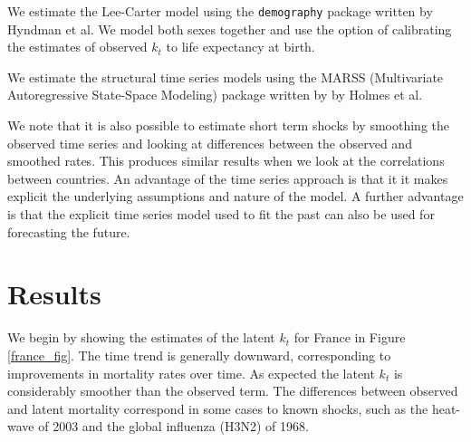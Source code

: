 \documentclass[12pt]{article}
\begin{document}
We estimate the Lee-Carter model using the {\tt demography} package
written by Hyndman et al. We model both sexes together and use the
option of calibrating the estimates of observed $k_t$ to life
expectancy at birth.

We estimate the structural time series models using the MARSS
(Multivariate Autoregressive State-Space Modeling)  package
written by by Holmes et al. 

We note that it is also possible to estimate short term shocks by
smoothing the observed time series and looking at differences between
the observed and smoothed rates. This produces similar results when we
look at the correlations between countries. An advantage of the time
series approach is that it it makes explicit the underlying
assumptions and nature of the model. A further advantage is that the
explicit time series model used to fit the past can also be used for
forecasting the future.


\section{Results}

We begin by showing the estimates of the latent $k_t$ for France in
Figure \ref{france_fig}. The time trend is generally downward, corresponding to
improvements in mortality rates over time. As expected the latent
$k_t$ is considerably smoother than the observed term. The
differences between observed and latent mortality correspond in some
cases to known shocks, such as the heat-wave of 2003 and the
global influenza (H3N2) of 1968.
\end{document}

